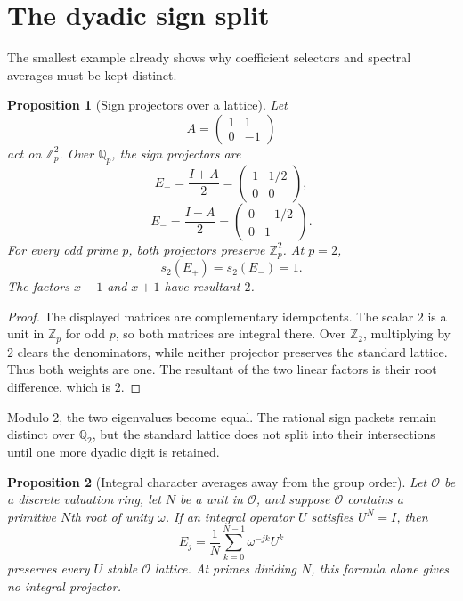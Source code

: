 \documentclass[11pt,a4paper]{article}
\newtheorem{proposition}[proposition]{Proposition}
\theoremstyle{definition}
\theoremstyle{remark}
\newcommand{\OO}{\mathcal O}
\providecommand{\OO}{\mathcal O}
\theoremstyle{definition}\newtheorem{construction}[theorem]{Construction}\newtheorem{certificate}[theorem]{Numerical Certificate}
\theoremstyle{remark}\newtheorem{boundary}[theorem]{Boundary}
\begin{document}
\section{The dyadic sign split}\label{sec:dyadic}

The smallest example already shows why coefficient selectors and spectral averages must be kept distinct.

\begin{proposition}[Sign projectors over a lattice]\label{prop:sign_projectors}
Let
\[
A=
\begin{pmatrix}
1&1\\
0&-1
\end{pmatrix}
\]
act on $\mathbb Z_p^2$.  Over $\mathbb Q_p$, the sign projectors are
\[
E_+=\frac{I+A}{2}
=
\begin{pmatrix}
1&1/2\\
0&0
\end{pmatrix},
\]
\[
E_-=\frac{I-A}{2}
=
\begin{pmatrix}
0&-1/2\\
0&1
\end{pmatrix}.
\]
For every odd prime $p$, both projectors preserve $\mathbb Z_p^2$.  At $p=2$,
\[
s_2(E_+)=s_2(E_-)=1.
\]
The factors $x-1$ and $x+1$ have resultant $2$.
\end{proposition}

\begin{proof}
The displayed matrices are complementary idempotents.  The scalar $2$ is a unit in $\mathbb Z_p$ for odd $p$, so both matrices are integral there.  Over $\mathbb Z_2$, multiplying by $2$ clears the denominators, while neither projector preserves the standard lattice.  Thus both weights are one.  The resultant of the two linear factors is their root difference, which is $2$.
\end{proof}

Modulo $2$, the two eigenvalues become equal.  The rational sign packets remain distinct over $\mathbb Q_2$, but the standard lattice does not split into their intersections until one more dyadic digit is retained.

\begin{proposition}[Integral character averages away from the group order]\label{prop:character_integrality}
Let $\OO$ be a discrete valuation ring, let $N$ be a unit in $\OO$, and suppose $\OO$ contains a primitive $N$th root of unity $\omega$.  If an integral operator $U$ satisfies $U^N=I$, then
\[
E_j=\frac1N\sum_{k=0}^{N-1}\omega^{-jk}U^k
\]
preserves every $U$ stable $\OO$ lattice.  At primes dividing $N$, this formula alone gives no integral projector.
\end{proposition}
\end{document}

